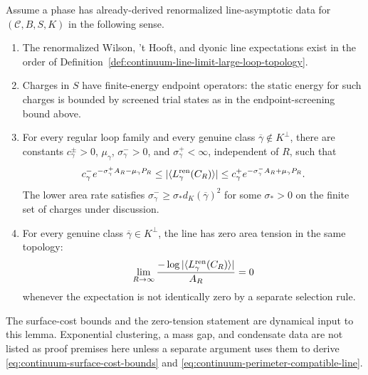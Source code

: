 \begin{lemma}
\label{lem:conditional-line-asymptotic-classification}
Assume a phase has already-derived renormalized line-asymptotic data for
\((\mathcal C,B,S,K)\) in the following sense.
\begin{enumerate}
  \item The renormalized Wilson, 't Hooft, and dyonic line expectations exist
  in the order of Definition~\ref{def:continuum-line-limit-large-loop-topology}.
  \item Charges in \(S\) have finite-energy endpoint operators: the static
  energy for such charges is bounded by screened trial states as in the
  endpoint-screening bound above.
  \item For every regular loop family and every genuine class
  \(\overline\gamma\notin K^\perp\), there are constants
  \(c_\gamma^\pm>0\), \(\mu_\gamma\), \(\sigma_\gamma^->0\), and
  \(\sigma_\gamma^+<\infty\), independent of \(R\), such that
  \begin{equation}
    c_\gamma^- e^{-\sigma_\gamma^+A_R-\mu_\gamma P_R}
    \le
    |\langle L_\gamma^{\rm ren}(C_R)\rangle|
    \le
    c_\gamma^+ e^{-\sigma_\gamma^-A_R+\mu_\gamma P_R}.
    \label{eq:continuum-surface-cost-bounds}
  \end{equation}
  The lower area rate satisfies
  \(\sigma_\gamma^-\ge\sigma_\ast d_K(\overline\gamma)^2\) for some
  \(\sigma_\ast>0\) on the finite set of charges under discussion.
  \item For every genuine class \(\overline\gamma\in K^\perp\), the line has
  zero area tension in the same topology:
  \begin{equation}
    \lim_{R\to\infty}
    \frac{-\log|\langle L_\gamma^{\rm ren}(C_R)\rangle|}{A_R}=0
    \label{eq:continuum-perimeter-compatible-line}
  \end{equation}
  whenever the expectation is not identically zero by a separate selection rule.
\end{enumerate}
The surface-cost bounds and the zero-tension statement are dynamical input to
this lemma.  Exponential clustering, a mass gap, and condensate data are not
listed as proof premises here unless a separate argument uses them to derive
\eqref{eq:continuum-surface-cost-bounds} and
\eqref{eq:continuum-perimeter-compatible-line}.


\end{lemma}
